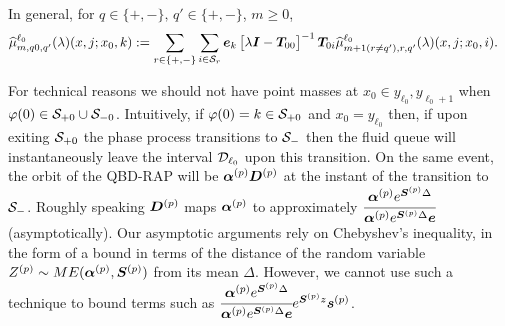 In general, for \(q\in \{+,-\}, \, q'\in\{+,-\}\), \(m\geq 0\),
\begin{align*}
	\widehat \mu_{m,q0,q'}^{\ell_0}(\lambda)(x,j;x_0,k) \nonumber 
	&:= \sum_{r\in\{+,-\}}\sum_{i\in\mathcal{S}_r}\boldsymbol e_k\begin{bmatrix} \lambda \boldsymbol I - \boldsymbol T_{00} \end{bmatrix}^{-1}\boldsymbol T_{0i}\widehat \mu_{m+1(r\neq q'),r,q'}^{\ell_0}(\lambda)(x,j;x_0,i).
\end{align*}

\begin{rem}
For technical reasons we should not have point masses at \(x_0\in{y_{\ell_0},y_{\ell_0+1}}\) when \(\varphi(0)\in\mathcal{S}_{+0}\cup\mathcal{S}_{-0}\). Intuitively, if \(\varphi(0)=k\in\mathcal{S}_{+0}\) and \(x_0 = y_{\ell_0}\) then, if upon exiting \(\mathcal{S}_{+0}\) the phase process transitions to \(\mathcal{S}_-\) then the fluid queue will instantaneously leave the interval \(\mathcal{D}_{\ell_0}\) upon this transition. On the same event, the orbit of the QBD-RAP will be \(\boldsymbol \alpha^{(p)} \boldsymbol D^{(p)}\) at the instant of the transition to \(\mathcal{S}_-\). Roughly speaking \(\boldsymbol D^{(p)}\) maps \(\boldsymbol \alpha^{(p)}\) to approximately \(\cfrac{\boldsymbol \alpha^{(p)} e^{\boldsymbol S^{(p)}\Delta}}{\boldsymbol \alpha^{(p)} e^{\boldsymbol S^{(p)}\Delta}\boldsymbol e}\) (asymptotically). Our asymptotic arguments rely on Chebyshev's inequality, in the form of a bound in terms of the distance of the random variable \(Z^{(p)}\sim ME(\boldsymbol\alpha^{(p)},\boldsymbol S^{(p)})\) from its mean \(\Delta\). However, we cannot use such a technique to bound terms such as \(\cfrac{\boldsymbol \alpha^{(p)} e^{\boldsymbol S^{(p)}\Delta}}{\boldsymbol \alpha^{(p)} e^{\boldsymbol S^{(p)}\Delta}\boldsymbol e}e^{\boldsymbol S^{(p)}z}\boldsymbol s^{(p)}\). %


\end{rem}
